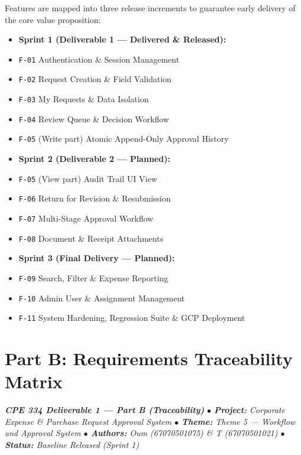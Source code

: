 \documentclass[11pt,a4paper]{article}
\begin{document}
Features are mapped into three release increments to guarantee early delivery of the core value proposition:\\

\begin{itemize}[leftmargin=*,itemsep=3pt,topsep=2pt]
  \item \textbf{Sprint 1 (Deliverable 1 — Delivered \& Released):}
  \item \texttt{F-01} Authentication \& Session Management
  \item \texttt{F-02} Request Creation \& Field Validation
  \item \texttt{F-03} My Requests \& Data Isolation
  \item \texttt{F-04} Review Queue \& Decision Workflow
  \item \texttt{F-05} (Write part) Atomic Append-Only Approval History
  \item \textbf{Sprint 2 (Deliverable 2 — Planned):}
  \item \texttt{F-05} (View part) Audit Trail UI View
  \item \texttt{F-06} Return for Revision \& Resubmission
  \item \texttt{F-07} Multi-Stage Approval Workflow
  \item \texttt{F-08} Document \& Receipt Attachments
  \item \textbf{Sprint 3 (Final Delivery — Planned):}
  \item \texttt{F-09} Search, Filter \& Expense Reporting
  \item \texttt{F-10} Admin User \& Assignment Management
  \item \texttt{F-11} System Hardening, Regression Suite \& GCP Deployment
\end{itemize}
\newpage
\section{Part B: Requirements Traceability Matrix}\label{sec:part-b}

\begin{tcolorbox}[colback=lightbg,colframe=secondary,arc=2mm,boxrule=0.8pt]\small\itshape
\textbf{CPE 334 Deliverable 1 — Part B (Traceability)} \quad $\bullet$ \quad \textbf{Project:} Corporate Expense \& Purchase Request Approval System \quad $\bullet$ \quad \textbf{Theme:} Theme 5 — Workflow and Approval System \quad $\bullet$ \quad \textbf{Authors:} Oum (67070501075) \& T (67070501021) \quad $\bullet$ \quad \textbf{Status:} Baseline Released (Sprint 1)
\end{tcolorbox}
\end{document}
